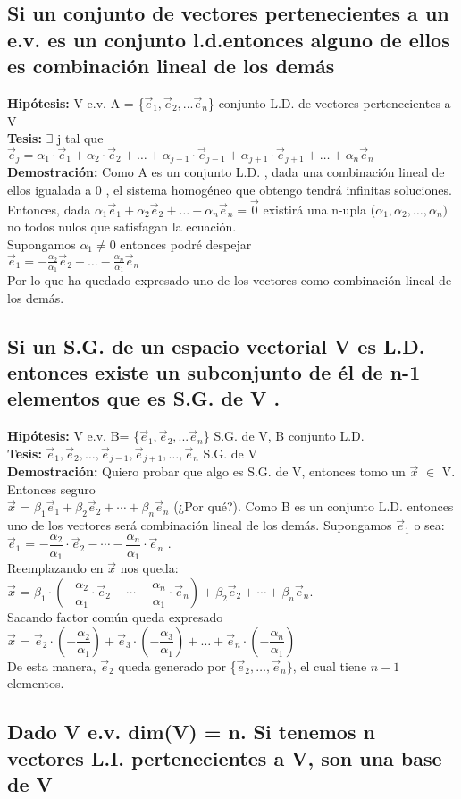 \documentclass[11pt]{article}
\begin{document}
\subsection{Si un conjunto de vectores pertenecientes a un e.v. es un conjunto l.d.entonces alguno de ellos es combinación lineal de los demás }
{\bfseries {Hipótesis:}} V e.v. A = \{$\vec{e}_{1}, \vec{e}_2,... \vec{e}_n $\} conjunto L.D. de vectores pertenecientes a V \\
{\bfseries {Tesis:}} $\exists$ j tal que $\vec{e}_j = \alpha_1\cdot\vec{e}_1 + \alpha_2\cdot\vec{e}_2 + \hdots + \alpha_{j-1}\cdot\vec{e}_{j-1} + \alpha_{j+1}\cdot\vec{e}_{j+1} + \hdots + \alpha_n\vec{e}_n$\\
{\bfseries Demostración:} Como A es un conjunto L.D. , dada una combinación lineal de ellos igualada a 0  , el sistema homogéneo que obtengo tendrá infinitas soluciones. \\
Entonces, dada $\alpha_1\vec{e}_1+\alpha_2\vec{e}_2+\hdots+\alpha_n\vec{e}_{n} = \vec{0}$ existirá una n-upla ($\alpha_1,\alpha_2,\hdots,\alpha_n)$ no todos nulos que satisfagan la ecuación.\\
Supongamos $\alpha_1 \neq 0$ entonces podré despejar \\
$\vec{e}_1 = -\frac{\alpha_2}{\alpha_1} \vec{e}_2 - \hdots - \frac{\alpha_n}{\alpha_1}\vec{e}_n$\\
Por lo que ha quedado expresado uno de los vectores como combinación lineal de los demás. 
\subsection{Si un S.G. de un espacio vectorial V es L.D. entonces existe un subconjunto de él de n-1 elementos que es S.G. de V .}
{\bfseries {Hipótesis:}} V e.v. B= \{$\vec{e}_{1}, \vec{e}_2,... \vec{e}_n $\} S.G. de V, B conjunto L.D. \\
{\bfseries {Tesis:}} $\vec{e}_1 , \vec{e}_2 , \hdots , \vec{e}_{j-1} , \vec{e}_{j+1} , \hdots , \vec{e}_n$ S.G. de V\\
{\bfseries Demostración:} Quiero probar que algo es S.G. de V, entonces tomo un $\vec{x}$ $\in$ V. Entonces seguro\\ $\vec{x}$ = $\beta_1\vec{e}_1+\beta_2\vec{e}_2+\cdots+\beta_n\vec{e}_n$ (¿Por qué?). Como B es un conjunto L.D. entonces uno de los vectores será combinación lineal de los demás. Supongamos $\vec{e}_1$ o sea: \\
$\vec{e}_1$ = $-\dfrac{\alpha_2}{\alpha_1}\cdot\vec{e}_2 - \cdots - \dfrac{\alpha_n}{\alpha_1}\cdot\vec{e}_n$ . \\
Reemplazando en $\vec{x}$ nos queda: \\
$\vec{x}$ = $\beta_1 \cdot (-\dfrac{\alpha_2}{\alpha_1}\cdot\vec{e}_2 - \cdots - \dfrac{\alpha_n}{\alpha_1}\cdot\vec{e}_n)+\beta_2\vec{e}_2+\cdots+\beta_n\vec{e}_n $. \\
Sacando factor común queda expresado\\ $\vec{x}$ = $\vec{e}_2 \cdot (- \dfrac{\alpha_2}{\alpha_1}) + \vec{e}_3 \cdot (- \dfrac{\alpha_3}{\alpha_1}) + \hdots + \vec{e}_n \cdot (-\dfrac{\alpha_n}{\alpha_1})$  \\
De esta manera, $\vec{e}_2$ queda generado por \{$\vec{e}_2,\hdots,\vec{e}_n\}$, el cual tiene $n-1$ elementos. 
\subsection{Dado V e.v. dim(V) = n. Si tenemos n vectores L.I. pertenecientes a V, son una base de V}
\end{document}
